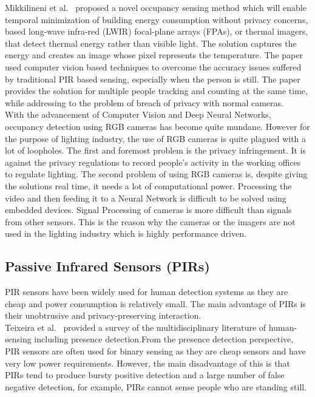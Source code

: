 Mikkilineni et al.~\cite{mikkilineni2019novel} proposed a novel occupancy sensing method which will enable temporal minimization of building energy consumption without privacy concerns, based long-wave infra-red (LWIR) focal-plane arrays (FPAs), or thermal imagers, that detect thermal energy rather than visible light. The solution captures the energy and creates an image whose pixel represents the temperature.  The paper used computer vision based techniques to overcome the accuracy issues suffered by traditional PIR based sensing, especially when the person is still. The paper provides the solution for multiple people tracking and counting at the same time, while addressing to the problem of breach of privacy with normal cameras.
\\

With the advancement of Computer Vision and Deep Neural Networks, occupancy detection using RGB cameras has become quite mundane. However for the purpose of lighting industry, the use of RGB cameras is quite plagued with a lot of loopholes. The first and foremost problem is the privacy infringement. It is against the privacy regulations to record people's activity in the working offices to regulate lighting. The second problem of using RGB cameras is, despite giving the solutions real time, it needs a lot of computational power. Processing the video and then feeding it to a Neural Network is difficult to be solved using embedded devices. Signal Processing of cameras is more difficult than signals from other sensors.  This is the reason why the cameras or the imagers are not used in the lighting industry which is highly performance driven. 


\subsection{Passive Infrared Sensors (PIRs)}
PIR sensors have been widely used for human detection systems as they are cheap and power consumption is relatively small. The main advantage of PIRs is their unobtrusive and privacy-preserving interaction.
\\

Teixeira et al.~\cite{teixeira2010survey} provided a survey of the multidisciplinary literature of human-sensing including presence detection.From the presence detection perspective, PIR sensors are often used for binary sensing as they are cheap sensors and have very low power requirements. However, the main
disadvantage of this is that PIRs tend to produce bursty positive detection and a large number of false negative
detection, for example, PIRs cannot sense people who are
standing still.
\\

